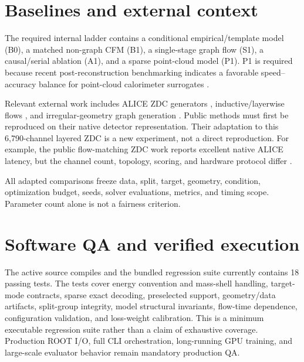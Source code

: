 \documentclass[10pt,a4paper]{article}
\begin{document}
\section{Baselines and external context}

The required internal ladder contains a conditional empirical/template model (B0), a matched non-graph CFM (B1), a single-stage graph flow (S1), a causal/serial ablation (A1), and a sparse point-cloud model (P1). P1 is required because recent post-reconstruction benchmarking indicates a favorable speed--accuracy balance for point-cloud calorimeter surrogates \cite{full_physics_benchmark,calopointflow2}.

Relevant external work includes ALICE ZDC generators \cite{alice_zdc_ml,wojnar_zdc,faster_zdc,expertsim}, inductive/layerwise flows \cite{icaloflow,l2lflows}, and irregular-geometry graph generation \cite{calograph}. Public methods must first be reproduced on their native detector representation. Their adaptation to this 6,790-channel layered ZDC is a new experiment, not a direct reproduction. For example, the public flow-matching ZDC work reports excellent native ALICE latency, but the channel count, topology, scoring, and hardware protocol differ \cite{faster_zdc}.

All adapted comparisons freeze data, split, target, geometry, condition, optimization budget, seeds, solver evaluations, metrics, and timing scope. Parameter count alone is not a fairness criterion.

\section{Software QA and verified execution}

The active source compiles and the bundled regression suite currently contains 18 passing tests. The tests cover energy convention and mass-shell handling, target-mode contracts, sparse exact decoding, preselected support, geometry/data artifacts, split-group integrity, model structural invariants, flow-time dependence, configuration validation, and loss-weight calibration. This is a minimum executable regression suite rather than a claim of exhaustive coverage. Production ROOT I/O, full CLI orchestration, long-running GPU training, and large-scale evaluator behavior remain mandatory production QA.
\end{document}
